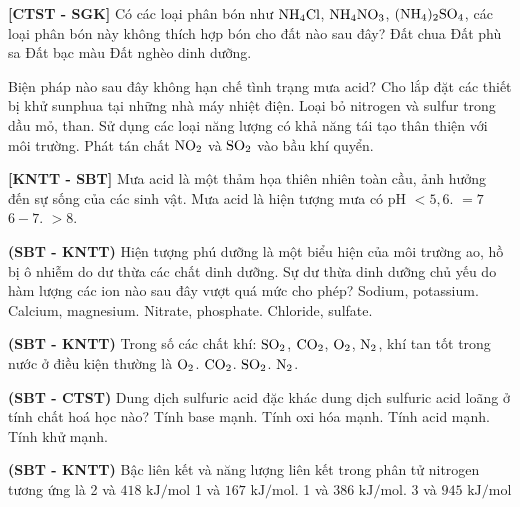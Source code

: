 \documentclass[12pt,a4paper]{article}
\begin{document}
\begin{ex}
\textbf{[CTST - SGK]} Có các loại phân bón như $\ce{NH4Cl}$, $\ce{NH4NO3}$, $\ce{(NH4)2SO4}$, các loại phân bón này không thích hợp bón cho đất nào sau đây?
\choice
{Đất chua}
{Đất phù sa}
{Đất bạc màu}
{Đất nghèo dinh dưỡng.}
\loigiai{}
\end{ex}

\begin{ex}
Biện pháp nào sau đây không hạn chế tình trạng mưa acid?
\choice
{Cho lắp đặt các thiết bị khử sunphua tại những nhà máy nhiệt điện.}
{Loại bỏ nitrogen và sulfur trong dầu mỏ, than.}
{Sử dụng các loại năng lượng có khả năng tái tạo thân thiện với môi trường.}
{Phát tán chất $\ce{NO2}$ và $\ce{SO2}$ vào bầu khí quyển.}
\loigiai{}
\end{ex}

\begin{ex}
\textbf{[KNTT - SBT]} Mưa acid là một thảm họa thiên nhiên toàn cầu, ảnh hưởng đến sự sống của các sinh vật. Mưa acid là hiện tượng mưa có pH
\choice
{$< 5{,}6.$}
{$= 7$}
{$6 - 7.$}
{$> 8.$}
\loigiai{}
\end{ex}

\begin{ex}
\textbf{(SBT - KNTT)} Hiện tượng phú dưỡng là một biểu hiện của môi trường ao, hồ bị ô nhiễm do dư thừa các chất dinh dưỡng. Sự dư thừa dinh dưỡng chủ yếu do hàm lượng các ion nào sau đây vượt quá mức cho phép?
\choice
{Sodium, potassium.}
{Calcium, magnesium.}
{Nitrate, phosphate.}
{Chloride, sulfate.}
\loigiai{}
\end{ex}

\begin{ex}
\textbf{(SBT - KNTT)} Trong số các chất khí: $\ce{SO2}$, $\ce{CO2}$, $\ce{O2}$, $\ce{N2}$, khí tan tốt trong nước ở điều kiện thường là
\choice
{$\ce{O2}$.}
{$\ce{CO2}$.}
{$\ce{SO2}$.}
{$\ce{N2}$.}
\loigiai{}
\end{ex}

\begin{ex}
\textbf{(SBT - CTST)} Dung dịch sulfuric acid đặc khác dung dịch sulfuric acid loãng ở tính chất hoá học nào?
\choice
{Tính base mạnh.}
{Tính oxi hóa mạnh.}
{Tính acid mạnh.}
{Tính khử mạnh.}
\loigiai{}
\end{ex}

\begin{ex}
\textbf{(SBT - KNTT)} Bậc liên kết và năng lượng liên kết trong phân tử nitrogen tương ứng là
\choice
{2 và $418\text{ kJ/mol}$}
{1 và $167\text{ kJ/mol}.$}
{1 và $386\text{ kJ/mol}.$}
{3 và $945\text{ kJ/mol}$}
\loigiai{}
\end{ex}
\end{document}
